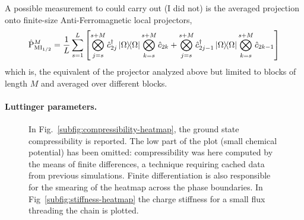 A possible measurement to could carry out (I did not) is the averaged projection onto finite-size Anti-Ferromagnetic local projectors,
\[
	\hat{\mathrm{P}}_{\mathrm{MI}_{1/2}}^M =
	\frac{1}{L} \sum_{s=1}^{L}
		\left[
			\bigotimes_{j=s}^{s+M} \hat c_{2j}^\dagger \op{\Omega}{\Omega} \bigotimes_{k=s}^{s+M} \hat c_{2k}
			+
			\bigotimes_{j=s}^{s+M} \hat c_{2j-1}^\dagger \op{\Omega}{\Omega} \bigotimes_{k=s}^{s+M} \hat c_{2k-1}
		\right]
\]
which is, the equivalent of the projector analyzed above but limited to blocks of length $M$ and averaged over different blocks.

\paragraph{Luttinger parameters.} 

\begin{figure}
	\centering	
	\caption{In Fig.~\ref{subfig:compressibility-heatmap}, the ground state compressibility is reported. The low part of the plot (small chemical potential) has been omitted: compressibility was here computed by the means of finite differences, a technique requiring cached data from previous simulations. Finite differentiation is also responsible for the smearing of the heatmap across the phase boundaries. In Fig~\ref{subfig:stiffness-heatmap} the charge stiffness for a small flux threading the chain is plotted.}
\end{figure}


